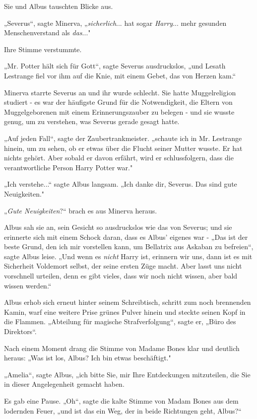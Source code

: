 {Sie und Albus tauschten Blicke aus.

„Severus“, sagte Minerva, „\emph{sicherlich}... hat sogar \emph{Harry}... mehr gesunden Menschenverstand als \emph{das}..."

Ihre Stimme verstummte.

„Mr. Potter hält sich für Gott“, sagte Severus ausdruckslos, „und Lesath Lestrange fiel vor ihm auf die Knie, mit einem Gebet, das von Herzen kam.“

Minerva starrte Severus an und ihr wurde schlecht. Sie hatte Muggelreligion studiert - es war der häufigste Grund für die Notwendigkeit, die Eltern von Muggelgeborenen mit einem Erinnerungszauber zu belegen - und sie wusste genug, um zu verstehen, was Severus gerade gesagt hatte.

„Auf jeden Fall“, sagte der Zaubertrankmeister. „schaute ich in Mr. Lestrange hinein, um zu sehen, ob er etwas über die Flucht seiner Mutter wusste. Er hat nichts gehört. Aber sobald er davon erfährt, wird er schlussfolgern, dass die verantwortliche Person Harry Potter war."

„Ich verstehe...“ sagte Albus langsam. „Ich danke dir, Severus. Das sind gute Neuigkeiten."

„\emph{Gute Neuigkeiten}?“ brach es aus Minerva heraus.

Albus sah sie an, sein Gesicht so ausdruckslos wie das von Severus; und sie erinnerte sich mit einem Schock daran, dass es Albus' eigenes war - „Das ist der beste Grund, den ich mir vorstellen kann, um Bellatrix aus Askaban zu befreien“, sagte Albus leise. „Und wenn es \emph{nicht} Harry ist, erinnern wir uns, dann ist es mit Sicherheit Voldemort selbst, der seine ersten Züge macht. Aber lasst uns nicht vorschnell urteilen, denn es gibt vieles, dass wir noch nicht wissen, aber bald wissen werden.“

Albus erhob sich erneut hinter seinem Schreibtisch, schritt zum noch brennenden Kamin, warf eine weitere Prise grünes Pulver hinein und steckte seinen Kopf in die Flammen. „Abteilung für magische Strafverfolgung“, sagte er, „Büro des Direktors“.

Nach einem Moment drang die Stimme von Madame Bones klar und deutlich heraus: „Was ist los, Albus? Ich bin etwas beschäftigt."

„Amelia“, sagte Albus, „ich bitte Sie, mir Ihre Entdeckungen mitzuteilen, die Sie in dieser Angelegenheit gemacht haben.

Es gab eine Pause. „Oh“, sagte die kalte Stimme von Madam Bones aus dem lodernden Feuer, „und ist das ein Weg, der in beide Richtungen geht, Albus?“

}
